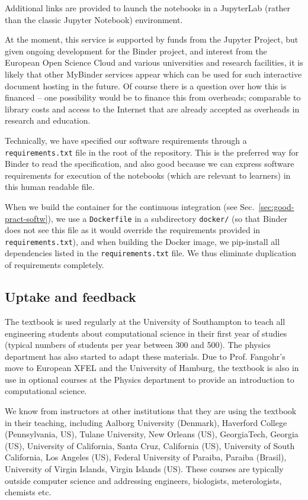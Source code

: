 \documentclass{deliverablereport}
\begin{document}
Additional links are provided to launch the notebooks in a JupyterLab
(rather than the classic Jupyter Notebook) environment.

At the moment, this service is supported by funds from the Jupyter
Project, but given ongoing development for the Binder project, and
interest from the European Open Science Cloud and various universities
and research facilities, it is likely that other MyBinder services
appear which can be used for such interactive document hosting in the
future. Of course there is a question over how this is financed -- one
possibility would be to finance this from overheads; comparable to
library costs and access to the Internet that are already accepted as
overheads in research and education.

Technically, we have specified our software requirements through a
\texttt{requirements.txt} file in the root of the repository. This is
the preferred way for Binder to read the specification, and also good
because we can express software requirements for execution of the
notebooks (which are relevant to learners) in this human readable
file.

When we build the container for the continuous integration (see
Sec.~\ref{sec:good-pract-softw}), we use a \texttt{Dockerfile} in a subdirectory
\texttt{docker/} (so that Binder does not see this file as it would
override the requirements provided in \texttt{requirements.txt}), and
when building the Docker image, we pip-install all dependencies listed
in the \texttt{requirements.txt} file. We thus eliminate duplication
of requirements completely.

\subsection{Uptake and feedback}

The textbook is used regularly at the University of Southampton to
teach all engineering students about computational science in their
first year of studies (typical numbers of students per year between
300 and 500). The physics department has also started to adapt these
materials. Due to Prof. Fangohr's move to European XFEL and the
University of Hamburg, the textbook is also in use in optional
courses at the Physics department to provide an introduction to
computational science.

We know from instructors at other institutions that they are using the
textbook in their teaching, including Aalborg University (Denmark),
Haverford College (Pennsylvania, US), Tulane University, New Orleans
(US), GeorgiaTech, Georgia (US), University of California, Santa Cruz,
California (US), University of South California, Los Angeles
(US), Federal University of Paraiba, Paraiba (Brasil), University of
Virgin Islands, Virgin Islands (US). These courses are typically
outside computer science and addressing engineers, biologists,
meterologists, chemists etc.
\end{document}
